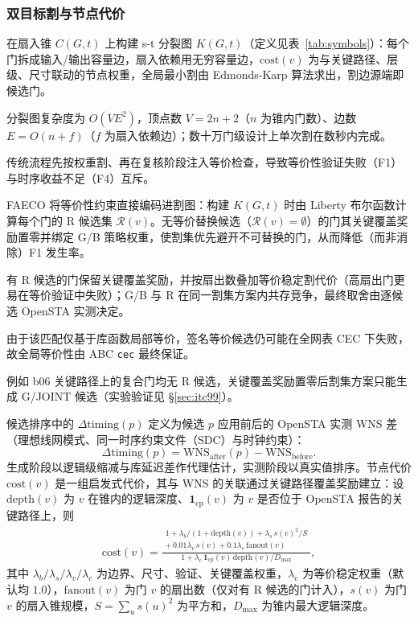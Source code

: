 \documentclass[journal]{IEEEtran}
\begin{document}
\subsubsection{双目标割与节点代价}
在扇入锥 $C(G, t)$ 上构建 s-t 分裂图 $K(G, t)$（定义见表~\ref{tab:symbols}）：每个门拆成输入/输出容量边，扇入依赖用无穷容量边，$\mathrm{cost}(v)$ 为与关键路径、层级、尺寸联动的节点权重，全局最小割由 Edmonds-Karp 算法求出，割边源端即候选门。

分裂图复杂度为 $O(VE^2)$，顶点数 $V=2n+2$（$n$ 为锥内门数）、边数 $E=O(n+f)$（$f$ 为扇入依赖边）；数十万门级设计上单次割在数秒内完成。

传统流程先按权重割、再在复核阶段注入等价检查，导致等价性验证失败（F1）与时序收益不足（F4）互斥。

FAECO 将等价性约束直接编码进割图：构建 $K(G, t)$ 时由 Liberty 布尔函数计算每个门的 R 候选集 $\mathcal{R}(v)$。无等价替换候选（$\mathcal{R}(v)=\emptyset$）的门其关键覆盖奖励置零并绑定 G/B 策略权重，使割集优先避开不可替换的门，从而降低（而非消除）F1 发生率。

有 R 候选的门保留关键覆盖奖励，并按扇出数叠加等价稳定割代价（高扇出门更易在等价验证中失败）；G/B 与 R 在同一割集方案内共存竞争，最终取舍由逐候选 OpenSTA 实测决定。

由于该匹配仅基于库函数局部等价，签名等价候选仍可能在全网表 CEC 下失败，故全局等价性由 ABC \texttt{cec} 最终保证。

例如 b06 关键路径上的复合门均无 R 候选，关键覆盖奖励置零后割集方案只能生成 G/JOINT 候选（实验验证见 \S\ref{sec:itc99}）。

候选排序中的 $\Delta\mathrm{timing}(p)$ 定义为候选 $p$ 应用前后的 OpenSTA 实测 WNS 差（理想线网模式、同一时序约束文件（SDC）与时钟约束）：
\begin{equation}\label{eq:dtiming}
\Delta\mathrm{timing}(p) = \mathrm{WNS}_{\mathrm{after}}(p) - \mathrm{WNS}_{\mathrm{before}}.
\end{equation}
生成阶段以逻辑级缩减与库延迟差作代理估计，实测阶段以真实值排序。节点代价 $\mathrm{cost}(v)$ 是一组启发式代价，其与 WNS 的关联通过关键路径覆盖奖励建立：设 $\mathrm{depth}(v)$ 为 $v$ 在锥内的逻辑深度、$\mathbf{1}_{\mathrm{cp}}(v)$ 为 $v$ 是否位于 OpenSTA 报告的关键路径上，则
{\small
\begin{equation}
\label{eq:cost}
\begin{split}
\mathrm{cost}(v) = \frac{\substack{1 + \lambda_b/(1+\mathrm{depth}(v)) + \lambda_s\,s(v)^2/S \\ +\, 0.01\lambda_v\,s(v) + 0.1\lambda_e\,\mathrm{fanout}(v)}}{1 + \lambda_c\,\mathbf{1}_{\mathrm{cp}}(v)\,\mathrm{depth}(v)/D_{\max}},
\end{split}
\end{equation}
}
其中 $\lambda_b/\lambda_s/\lambda_v/\lambda_c$ 为边界、尺寸、验证、关键覆盖权重，$\lambda_e$ 为等价稳定权重（默认均 $1.0$），$\mathrm{fanout}(v)$ 为门 $v$ 的扇出数（仅对有 R 候选的门计入），$s(v)$ 为门 $v$ 的扇入锥规模，$S=\sum_u s(u)^2$ 为平方和，$D_{\max}$ 为锥内最大逻辑深度。
\end{document}
